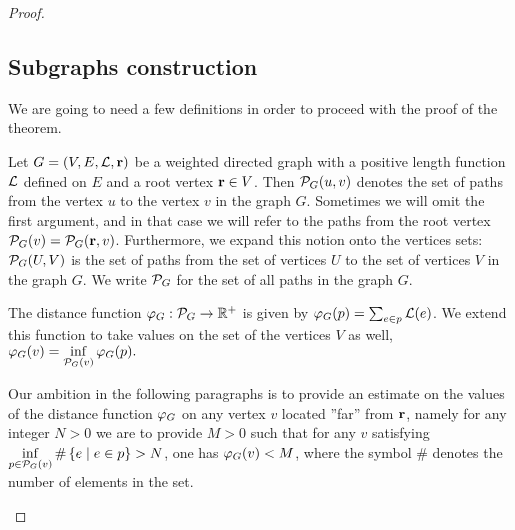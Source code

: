 \documentclass[12pt,oneside,a4paper]{amsart}
\begin{document}
\begin{proof}
      \subsection{Subgraphs construction}
        We are going to need a few definitions in order to proceed with the proof of the theorem.
        \begin{definition}
          Let $G = (V, E,\mathcal{L}, \mathbf{r})$ be a weighted directed graph with a positive
            length function $\mathcal{L}$ defined on $E$ and a root vertex $\mathbf{r} \in V$.
          Then $\mathcal{P}_{G}(u, v)$ denotes the set of paths from the vertex $u$ to the vertex $v$ in the graph $G$.
          Sometimes we will omit the first argument, and in that case we will refer to the paths from the root vertex
            $\mathcal{P}_{G}(v) = \mathcal{P}_{G}(\mathbf{r}, v)$.
          Furthermore, we expand this notion onto the vertices sets: $\mathcal{P}_{G}(U,V)$ is the set of paths
            from the set of vertices $U$ to the set of vertices $V$ in the graph $G$.
          We write $\mathcal{P}_{G}$ for the set of all paths in the graph $G$.
        \end{definition}
        \begin{definition}
          The distance function $\varphi_{G}: \mathcal{P}_{G} \to \mathbb{R}^{+}$ is given by $\varphi_{G}(p) = \sum_{e \in p} \mathcal{L}(e)$.
          We extend this function to take values on the set of the vertices $V$ as well,
            $\varphi_{G}(v) = \displaystyle\inf_{\mathcal{P}_{G}(v)} \varphi_{G}(p).$
        \end{definition}
        \begin{remark}
          Our ambition in the following paragraphs is to provide an estimate on the values of the distance function $\varphi_{G}$ on any vertex $v$
            located ''far'' from $\mathbf{r}$, namely for any integer $N > 0$ we are to provide $M > 0$ such that
            for any $v$ satisfying $\displaystyle\inf_{p \in \mathcal{P}_{G}(v)} \#\left\{ e \mid e \in p\right\} > N$,
              one has $\varphi_{G}(v) < M$, where the symbol $\#$ denotes the number of elements in the set.
        \end{remark}


\end{proof}
\end{document}
